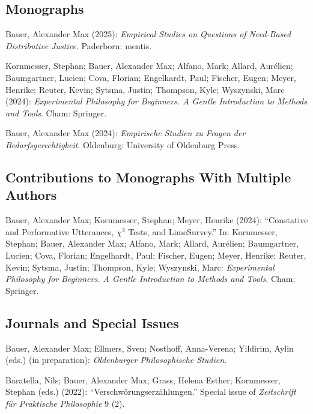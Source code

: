 \documentclass[a4paper,10pt]{article}
\newenvironment{literature}{%
   \parskip6pt\parindent0pt\raggedright
   \def\lititem{\hangindent=1cm\hangafter1}}{%
   \par\ignorespaces}
\begin{document}
\subsection*{Monographs}
\begin{literature}
\lititem Bauer, Alexander Max (2025): \textit{Empirical Studies on Questions of Need-Based Distributive Justice}. Paderborn: mentis.

\lititem Kornmesser, Stephan; Bauer, Alexander Max; Alfano, Mark; Allard, Aurélien; Baumgartner, Lucien; Cova, Florian; Engelhardt, Paul; Fischer, Eugen; Meyer, Henrike; Reuter, Kevin; Sytsma, Justin; Thompson, Kyle; Wyszynski, Marc (2024): \textit{Experimental Philosophy for Beginners. A Gentle Introduction to Methods and Tools}. Cham: Springer.

\lititem Bauer, Alexander Max (2024): \textit{Empirische Studien zu Fragen der Bedarfsgerechtigkeit}. Oldenburg: University of Oldenburg Press.
\end{literature}


\subsection*{Contributions to Monographs With Multiple Authors}
\begin{literature}
\lititem Bauer, Alexander Max; Kornmesser, Stephan; Meyer, Henrike (2024): \enquote{Constative and Performative Utterances, $\chi^2$ Tests, and LimeSurvey.} In: Kornmesser, Stephan; Bauer, Alexander Max; Alfano, Mark; Allard, Aurélien; Baumgartner, Lucien; Cova, Florian; Engelhardt, Paul; Fischer, Eugen; Meyer, Henrike; Reuter, Kevin; Sytsma, Justin; Thompson, Kyle; Wyszynski, Marc: \textit{Experimental Philosophy for Beginners. A Gentle Introduction to Methods and Tools}. Cham: Springer.
\end{literature}


\subsection*{Journals and Special Issues}
\begin{literature}
\lititem Bauer, Alexander Max; Ellmers, Sven; Nosthoff, Anna-Verena; Yildirim, Aylin (eds.) (in preparation): \textit{Oldenburger Philosophische Studien}.

\lititem Baratella, Nils; Bauer, Alexander Max; Grass, Helena Esther; Kornmesser, Stephan (eds.) (2022): \enquote{Verschwörungserzählungen.} Special issue of \textit{Zeitschrift für Praktische Philosophie} 9 (2).
\end{literature}
\end{document}
